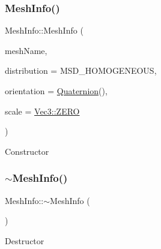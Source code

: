 \subsubsection{\texorpdfstring{Mesh\+Info()}{MeshInfo()}\hspace{0.1cm}{\footnotesize\ttfamily [1/2]}}
{\footnotesize\ttfamily Mesh\+Info\+::\+Mesh\+Info (\begin{DoxyParamCaption}\item[{const std\+::string \&}]{mesh\+Name,  }\item[{const \hyperlink{classMeshInfo_aadc99105abbc3bd033e33c6ba512a13b}{Mesh\+Surface\+Distribution}}]{distribution = {\ttfamily MSD\+\_\+HOMOGENEOUS},  }\item[{const \hyperlink{classQuaternion}{Quaternion} \&}]{orientation = {\ttfamily \hyperlink{classQuaternion}{Quaternion}()},  }\item[{const \hyperlink{classVec3}{Vec3} \&}]{scale = {\ttfamily \hyperlink{classVec3_a26c0c52a5fba36ed0ef5e6d5026569f4}{Vec3\+::\+Z\+E\+RO}} }\end{DoxyParamCaption})}

Constructor \mbox{\label{classMeshInfo_aff7c5864479b8923d156aa04f27dfb3b}} 
\subsubsection{\texorpdfstring{$\sim$\+Mesh\+Info()}{~MeshInfo()}\hspace{0.1cm}{\footnotesize\ttfamily [1/2]}}
{\footnotesize\ttfamily Mesh\+Info\+::$\sim$\+Mesh\+Info (\begin{DoxyParamCaption}\item[{void}]{ }\end{DoxyParamCaption})}

Destructor \mbox{\label{classMeshInfo_a5ccfea990dba31ade66e5358b05b20b6}} 

